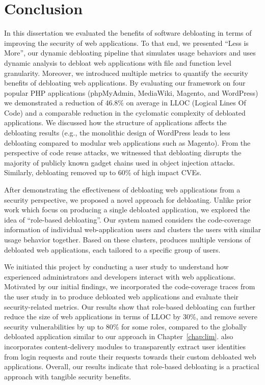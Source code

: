 \chapter{Conclusion}
\label{chap:conclusion}

In this dissertation we evaluated the benefits of software debloating in terms of improving the security of web applications. 
To that end, we presented ``Less is More'', our dynamic debloating pipeline that simulates usage behaviors and uses dynamic analysis to debloat web applications with file and function level granularity. 
Moreover, we introduced multiple metrics to quantify the security benefits of debloating web applications. 
By evaluating our framework on four popular PHP applications (phpMyAdmin, MediaWiki, Magento, and WordPress) we demonstrated a reduction of 46.8\% on average in LLOC (Logical Lines Of Code) and a comparable reduction in the cyclomatic complexity of debloated applications. 
We discussed how the structure of applications affects the debloating results (e.g., the monolithic design of WordPress leads to less debloating compared to modular web applications such as Magento). 
From the perspective of code reuse attacks, we witnessed that debloating disrupts the majority of publicly known gadget chains used in object injection attacks. 
Similarly, debloating removed up to 60\% of high impact CVEs. 

After demonstrating the effectiveness of debloating web applications from a security perspective, we proposed a novel approach for debloating. 
Unlike prior work which focus on producing a single debloated application, we explored the idea of ``role-based debloating''. 
Our system named \dbltr{} considers the code-coverage information of individual web-application users and clusters the users with similar usage behavior together. 
Based on these clusters, \dbltr{} produces multiple versions of debloated web applications, each tailored to a specific group of users. 

We initiated this project by conducting a user study to understand how experienced administrators and developers interact with web applications. 
Motivated by our initial findings, we incorporated the code-coverage traces from the user study in \dbltr{} to produce debloated web applications and evaluate their security-related metrics. 
Our results show that role-based debloating can further reduce the size of web applications in terms of LLOC by 30\%, and remove severe security vulnerabilities by up to 80\% for some roles, compared to the globally debloated application similar to our approach in Chapter~\ref{chap:lim}. 
\dbltr{} also incorporates content-delivery modules to transparently extract user identities from login requests and route their requests towards their custom debloated web applications. 
Overall, our results indicate that role-based debloating is a practical approach with tangible security benefits. 

